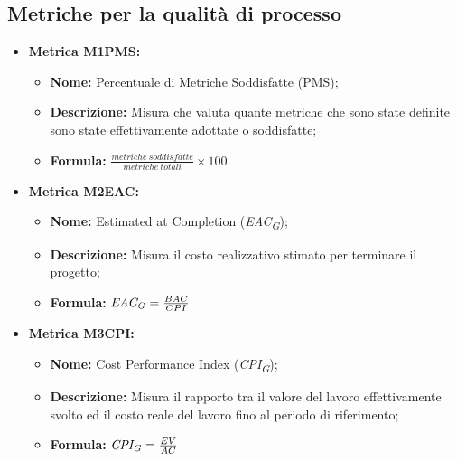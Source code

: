 \subsection{Metriche per la qualità di processo}
\begin{itemize}
    \vspace{0.4cm}
    \item \hypertarget{item:M1PMS}{\textbf{Metrica M1PMS:}}
    \vspace{0.2cm}

    \begin{minipage}[H]{0.9\textwidth}
        \begin{itemize}
        \item \textbf{Nome:} Percentuale di Metriche Soddisfatte (PMS);
        \item \textbf{Descrizione:} Misura che valuta quante metriche che sono state definite sono state effettivamente adottate o soddisfatte;
        \item \textbf{Formula:} $\frac{metriche \ soddisfatte}{metriche \ totali}\times 100$
        \end{itemize}
    \end{minipage}

    \vspace{0.4cm}
    \item \hypertarget{item:M2EAC}{\textbf{Metrica M2EAC:}}
    \vspace{0.2cm}

    \begin{minipage}[H]{0.9\textwidth}
        \begin{itemize}
            \item \textbf{Nome:} Estimated at Completion (\textit{EAC}\textsubscript{\textit{G}});
            \item \textbf{Descrizione:} Misura il costo realizzativo stimato per terminare il progetto;
            \item \textbf{Formula:} $\textit{EAC}\textsubscript{\textit{G}} = \frac{BAC}{CPI}$
        \end{itemize}
    \end{minipage}

    \vspace{0.4cm}
    \item \hypertarget{item:M3CPI}{\textbf{Metrica M3CPI:}}
    \vspace{0.2cm}

    \begin{minipage}[H]{0.9\textwidth}
        \begin{itemize}
            \item \textbf{Nome:} Cost Performance Index (\textit{CPI}\textsubscript{\textit{G}});
            \item \textbf{Descrizione:} Misura il rapporto tra il valore del lavoro effettivamente svolto ed il costo reale del lavoro fino al periodo di riferimento;
            \item \textbf{Formula:} $\textit{CPI}\textsubscript{\textit{G}} = \frac{EV}{AC}$
        \end{itemize}
    \end{minipage}


\end{itemize}
